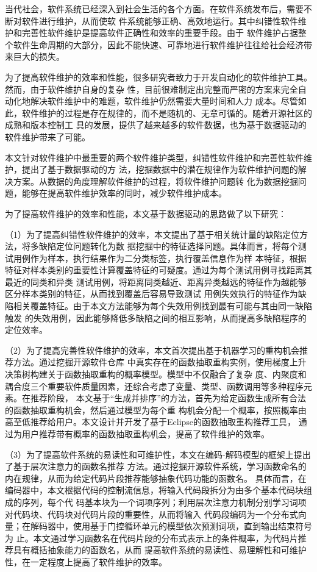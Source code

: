 

\begin{zhaiyao}

当代社会，软件系统已经深入到社会生活的各个方面。在软件系统发布后，需要不断对软件进行维护，从而使软
件系统能够正确、高效地运行。其中纠错性软件维护和完善性软件维护是提高软件正确性和效率的重要手段。由于
软件维护占据整个软件生命周期的大部分，因此不能快速、可靠地进行软件维护往往给社会经济带来巨大的损失。

为了提高软件维护的效率和性能，很多研究者致力于开发自动化的软件维护工具。然而，由于软件维护自身的复杂
性，目前很难制定出完整而严密的方案来完全自动化地解决软件维护中的难题，软件维护仍然需要大量时间和人力
成本。尽管如此，软件维护的过程是存在规律的，而不是随机的、无章可循的。随着开源社区的成熟和版本控制工
具的发展，提供了越来越多的软件数据，也为基于数据驱动的软件维护带来了可能。

本文针对软件维护中最重要的两个软件维护类型，纠错性软件维护和完善性软件维护，提出了基于数据驱动的方
法，挖掘数据中的潜在规律作为软件维护问题的解决方案。从数据的角度理解软件维护的过程，将软件维护问题转
化为数据挖掘问题，能够在提高软件维护效率的同时，减少软件维护成本。

为了提高软件维护的效率和性能，本文基于数据驱动的思路做了以下研究：

（1）为了提高纠错性软件维护的效率，本文提出了基于相关统计量的缺陷定位方法，将多缺陷定位问题转化为数
据挖掘中的特征选择问题。具体而言，将每个测试用例作为样本，执行结果作为二分类标签，执行覆盖信息作为样
本特征，根据特征对样本类别的重要性计算覆盖特征的可疑度。通过为每个测试用例寻找距离其最近的同类和异类
测试用例，将距离同类越近、距离异类越远的特征作为越能够区分样本类别的特征，从而找到覆盖后容易导致测试
用例失效执行的特征作为缺陷相关覆盖特征。由于本文方法能够为每个失效用例找到最有可能与其由同一缺陷触发
的失效用例，因此能够降低多缺陷之间的相互影响，从而提高多缺陷程序的定位效率。

（2）为了提高完善性软件维护的效率，本文首次提出基于机器学习的重构机会推荐方法。通过挖掘开源软件仓库
中真实存在的函数抽取重构实例，使用梯度上升决策树构建关于函数抽取重构的概率模型。模型中不仅融合了复杂
度、内聚度和耦合度三个重要软件质量因素，还综合考虑了变量、类型、函数调用等多种程序元素。在推荐阶段，
本文基于``生成并排序''的方法，首先为给定函数生成所有合法的函数抽取重构机会，然后通过模型为每个重
构机会分配一个概率，按照概率由高至低推荐给用户。本文设计并开发了基于Eclipse的函数抽取重构推荐工具，
通过为用户推荐带有概率的函数抽取重构机会，提高了软件维护的效率。

（3）为了提高软件系统的易读性和可维护性，本文在编码-解码模型的框架上提出了基于层次注意力的函数名推荐
方法。通过挖掘开源软件系统，学习函数命名的内在规律，从而为给定代码片段推荐能够抽象代码功能的函数名。
具体而言，在编码器中，本文根据代码的控制流信息，将输入代码段拆分为由多个基本代码块组成的序列，每个代
码基本块为一个词项序列；利用层次注意力机制分别学习词项对代码块、代码块对代码片段的重要性，从而将输入
代码段编码为一个分布式向量；在解码器中，使用基于门控循环单元的模型依次预测词项，直到输出结束符号为
止。本文通过学习函数名在代码片段的分布式表示上的条件概率，为代码片推荐具有概括抽象能力的函数名，从而
提高软件系统的易读性、易理解性和可维护性，在一定程度上提高了软件维护的效率。
\end{zhaiyao}

